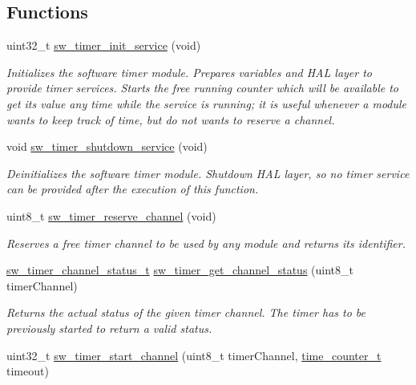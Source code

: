 \subsection*{Functions}
\begin{DoxyCompactItemize}
\item 
uint32\+\_\+t \hyperlink{group__sw__timer_ga3c3614b044470b0fbaf07fe74b061406}{sw\+\_\+timer\+\_\+init\+\_\+service} (void)
\begin{DoxyCompactList}\small\item\em Initializes the software timer module. Prepares variables and H\+AL layer to provide timer services. Starts the free running counter which will be available to get its value any time while the service is running; it is useful whenever a module wants to keep track of time, but do not wants to reserve a channel. \end{DoxyCompactList}\item 
void \hyperlink{group__sw__timer_gaf9f4848ee97f18dbeceb31aded25ec5c}{sw\+\_\+timer\+\_\+shutdown\+\_\+service} (void)
\begin{DoxyCompactList}\small\item\em Deinitializes the software timer module. Shutdown H\+AL layer, so no timer service can be provided after the execution of this function. \end{DoxyCompactList}\item 
uint8\+\_\+t \hyperlink{group__sw__timer_gaeb2e62af95eb77e6b9427d78c3e02bdd}{sw\+\_\+timer\+\_\+reserve\+\_\+channel} (void)
\begin{DoxyCompactList}\small\item\em Reserves a free timer channel to be used by any module and returns its identifier. \end{DoxyCompactList}\item 
\hyperlink{group__sw__timer_ga11c8ba265a273d5d3dda5e269163d3e7}{sw\+\_\+timer\+\_\+channel\+\_\+status\+\_\+t} \hyperlink{group__sw__timer_gad704fb2eb92414b57e13df021591593d}{sw\+\_\+timer\+\_\+get\+\_\+channel\+\_\+status} (uint8\+\_\+t timer\+Channel)
\begin{DoxyCompactList}\small\item\em Returns the actual status of the given timer channel. The timer has to be previously started to return a valid status. \end{DoxyCompactList}\item 
uint32\+\_\+t \hyperlink{group__sw__timer_ga755aef7ee6f71dac4b4978a076b0c447}{sw\+\_\+timer\+\_\+start\+\_\+channel} (uint8\+\_\+t timer\+Channel, \hyperlink{group__sw__timer_ga85b49889ff28c6bc6a5368a08b0f9650}{time\+\_\+counter\+\_\+t} timeout)

\end{DoxyCompactItemize}
